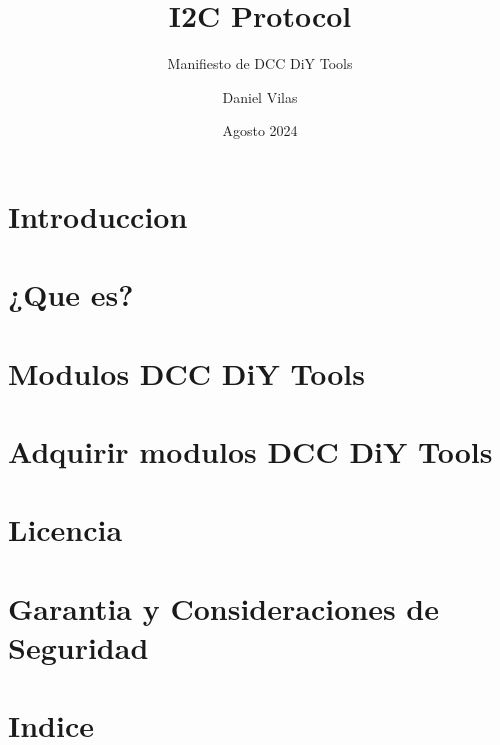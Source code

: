 \documentclass[spanish]{DccDiyTools/DccDiyTools}
\title{I2C Protocol}
\subtitle{Manifiesto de DCC DiY Tools}
\author{Daniel Vilas}
\date{Agosto 2024}
\begin{document}
\maketitle{}
\newpage{}
\section{Introduccion}

\newpage{}
\section{¿Que es?}

\newpage{}
\section{Modulos DCC DiY Tools}


\newpage{}
\section{Adquirir modulos DCC DiY Tools}


\newpage{}
\section{Licencia}

\newpage{}
\section{Garantia y Consideraciones de Seguridad}

\newpage{}
\section{Indice}
\tableofcontents{}

\listoffigures{}
\listoftables{}
\end{document}
